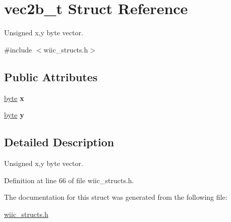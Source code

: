 \hypertarget{structvec2b__t}{\section{vec2b\-\_\-t Struct Reference}
\label{structvec2b__t}
}


Unsigned x,y byte vector.  




{\ttfamily \#include $<$wiic\-\_\-structs.\-h$>$}

\subsection*{Public Attributes}
\begin{DoxyCompactItemize}
\item 
\hypertarget{structvec2b__t_a770aacd26e2799bccfecd8eeb4f16092}{\hyperlink{wiic__macros_8h_a0c8186d9b9b7880309c27230bbb5e69d}{byte} {\bfseries x}}\label{structvec2b__t_a770aacd26e2799bccfecd8eeb4f16092}

\item 
\hypertarget{structvec2b__t_ad69850e7b8fd19a9cb69431d5dbfab83}{\hyperlink{wiic__macros_8h_a0c8186d9b9b7880309c27230bbb5e69d}{byte} {\bfseries y}}\label{structvec2b__t_ad69850e7b8fd19a9cb69431d5dbfab83}

\end{DoxyCompactItemize}


\subsection{Detailed Description}
Unsigned x,y byte vector. 

Definition at line 66 of file wiic\-\_\-structs.\-h.



The documentation for this struct was generated from the following file\-:\begin{DoxyCompactItemize}
\item 
\hyperlink{wiic__structs_8h}{wiic\-\_\-structs.\-h}\end{DoxyCompactItemize}
